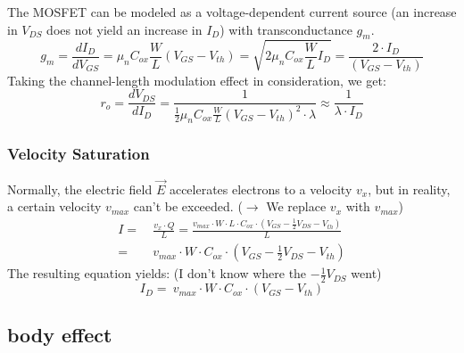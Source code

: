 \documentclass[11ypt]{extarticle}
\begin{document}
The MOSFET can be modeled as a voltage-dependent current source (an increase in $V_{DS}$ does not yield an increase in $I_D$) with transconductance $g_m$.
\begin{equation}
    g_m = \frac{dI_D}{dV_{GS}} = \mu_n C_{ox} \frac{W}{L}(V_{GS} - V_{th}) = \sqrt{2 \mu_n C_{ox} \frac{W}{L} I_D} = \frac{2 \cdot I_D}{(V_{GS} - V_{th})}
\end{equation}
Taking the channel-length modulation effect in consideration, we get:
\begin{equation}
    r_o = \frac{dV_{DS}}{dI_D} = \frac{1}{\frac{1}{2}\mu_n C_{ox} \frac{W}{L}(V_{GS} - V_{th})^2 \cdot\lambda} \approx \frac{1}{\lambda \cdot I_D}
\end{equation}

\subsubsection{Velocity Saturation}

Normally, the electric field $\vec{E}$ accelerates electrons to a velocity $v_x$, but in reality, a certain velocity $v_{max}$ can't be exceeded. ($\rightarrow$ We replace $v_x$ with $v_{max}$)
\begin{equation}
\begin{aligned}
    I =& \ \frac{v_x \cdot Q}{L} = \frac{v_{max} \cdot W \cdot L \cdot C_{ox} \cdot (V_{GS} - \frac{1}{2}V_{DS} - V_{th})}{L}
    \\
    =& \ v_{max} \cdot W \cdot C_{ox} \cdot (V_{GS} - \frac{1}{2}V_{DS} - V_{th})
\end{aligned}
\end{equation}
The resulting equation yields: (I don't know where the $- \frac{1}{2}V_{DS}$ went)
\begin{equation}
    I_D = \ v_{max} \cdot W \cdot C_{ox} \cdot (V_{GS}- V_{th})
\end{equation}

\subsection{body effect}
\end{document}
